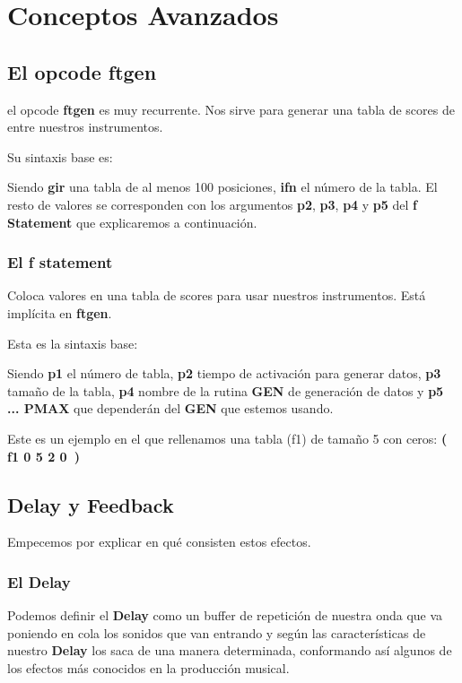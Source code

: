 
\chapter{Conceptos Avanzados}

\section{El opcode ftgen}

el opcode \textbf{ftgen} es muy recurrente. Nos sirve para generar una tabla de scores de entre nuestros instrumentos.

Su sintaxis base es:


Siendo \textbf{gir} una tabla de al menos 100 posiciones, \textbf{ifn} el número de la tabla. El resto de valores se corresponden con los argumentos \textbf{p2}, \textbf{p3}, \textbf{p4} y \textbf{p5} del \textbf{f Statement} que explicaremos a continuación.

\subsection{El f statement}

Coloca valores en una tabla de scores para usar nuestros instrumentos. Está implícita en \textbf{ftgen}.

Esta es la sintaxis base:


Siendo \textbf{p1} el número de tabla, \textbf{p2} tiempo de activación para generar datos, \textbf{p3} tamaño de la tabla, \textbf{p4} nombre de la rutina \textbf{GEN} de generación de datos y \textbf{p5 ... PMAX} que dependerán del \textbf{GEN} que estemos usando.

Este es un ejemplo en el que rellenamos una tabla (f1) de tamaño 5 con ceros: \textbf{( f1 0 5 2 0\ )}

\section{Delay y Feedback}

Empecemos por explicar en qué consisten estos efectos. 

\subsection{El Delay}
Podemos definir el \textbf{Delay} como un buffer de repetición de nuestra onda que va poniendo en cola los sonidos que van entrando y según las características de nuestro \textbf{Delay} los saca de una manera determinada, conformando así algunos de los efectos más conocidos en la producción musical. 

